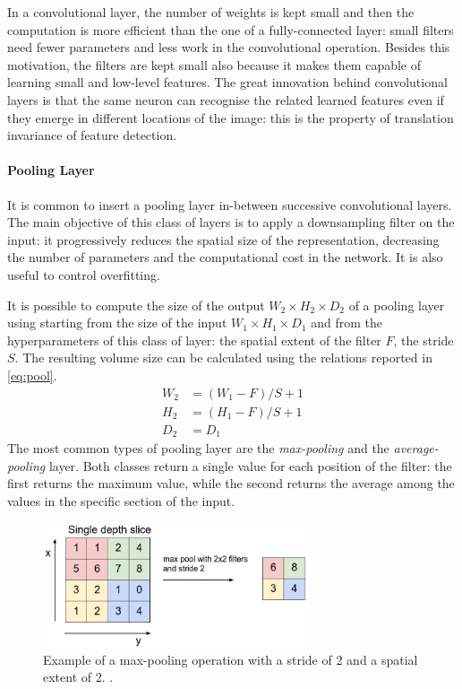 In a convolutional layer, the number of weights is kept small and then the computation is more efficient than the one of a fully-connected layer: small filters need fewer parameters and less work in the convolutional operation.
Besides this motivation, the filters are kept small also because it makes them capable of learning small and low-level features.
The great innovation behind convolutional layers is that the same neuron can recognise the related learned features even if they emerge in different locations of the image: this is the property of translation invariance of feature detection.

\paragraph{Pooling Layer}

It is common to insert a pooling layer in-between successive convolutional layers.
The main objective of this class of layers is to apply a downsampling filter on the input: it progressively reduces the spatial size of the representation, decreasing the number of parameters and the computational cost in the network.
It is also useful to control overfitting.

It is possible to compute the size of the output $W_2 \times H_2 \times D_2$ of a pooling layer using starting from the size of the input $W_1 \times H_1 \times D_1$ and from the hyperparameters of this class of layer: the spatial extent of the filter $F$, the stride $S$.
The resulting volume size can be calculated using the relations reported in \vref{eq:pool}.
\begin{equation} \label{eq:pool}
	\begin{aligned}
		W_2 & = (W_1 - F)/S + 1  \\
		H_2 & = (H_1 - F )/S + 1 \\
		D_2 & = D_1
	\end{aligned}
\end{equation}
The most common types of pooling layer are the \textit{max-pooling} and the \textit{average-pooling} layer.
Both classes return a single value for each position of the filter: the first returns the maximum value, while the second returns the average among the values in the specific section of the input.



\begin{figure}[!h]
	\centering
	\includegraphics[width=0.7\textwidth]{img/maxpool.jpeg}
	\caption[Max-Pooling layer example]{Example of a max-pooling operation with a stride of 2 and a spatial extent of 2.
		\cite{stanford2019cs231n}.}
	\label{fig:avgpool}
\end{figure}

